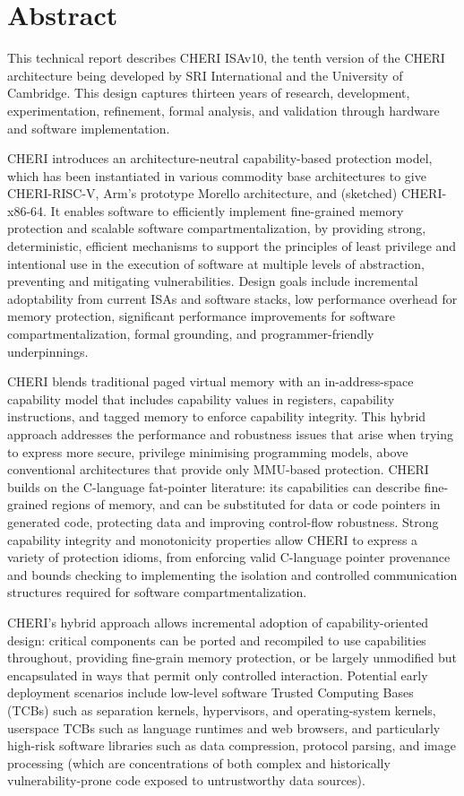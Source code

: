\section*{Abstract}

This technical report describes CHERI ISAv10, the tenth version of the
CHERI architecture
being developed by SRI International and the University of Cambridge.
This design captures thirteen years of research, development, experimentation,
refinement, formal analysis, and validation through hardware and software
implementation.

CHERI introduces an architecture-neutral capability-based protection
model, which has been instantiated in various commodity base architectures
to give
CHERI-RISC-V, Arm's prototype Morello architecture, and (sketched)
CHERI-x86-64.
It enables software
to efficiently implement fine-grained memory protection and scalable software
compartmentalization, by providing strong, deterministic, efficient
mechanisms to support the principles of least privilege and intentional use
in the execution of software at multiple levels of abstraction, preventing and
mitigating vulnerabilities.
Design goals include incremental adoptability from current ISAs and
software stacks, low performance overhead for memory protection, significant
performance improvements for software compartmentalization, formal grounding,
and programmer-friendly underpinnings.

CHERI blends traditional paged virtual memory with an
in-address-space capability model that includes capability values in registers,
capability instructions, and tagged memory to enforce capability integrity.
This hybrid approach addresses the performance and robustness issues that arise
when trying to express more secure, privilege minimising programming models,
above conventional architectures that provide only MMU-based protection.
CHERI builds on the C-language fat-pointer literature: its capabilities can
describe fine-grained regions of memory, and can be substituted for data or
code pointers in generated code, protecting data and improving
control-flow robustness.
Strong capability integrity and monotonicity properties allow CHERI
to express a variety of protection idioms, from enforcing valid C-language
pointer provenance and bounds checking to implementing the isolation and
controlled communication structures required for software
compartmentalization.

CHERI's hybrid approach allows incremental adoption of capability-oriented design:
critical components can be ported and recompiled to use capabilities throughout,
providing fine-grain memory protection, or be largely unmodified but encapsulated in ways that permit
only controlled interaction.
Potential early deployment scenarios include low-level software Trusted Computing
Bases (TCBs) such as separation kernels, hypervisors, and operating-system
kernels, userspace TCBs such as language runtimes and web browsers,
and particularly high-risk
software libraries such as data compression, protocol parsing, and image
processing (which are concentrations of both complex and historically
vulnerability-prone code exposed to untrustworthy data sources).

